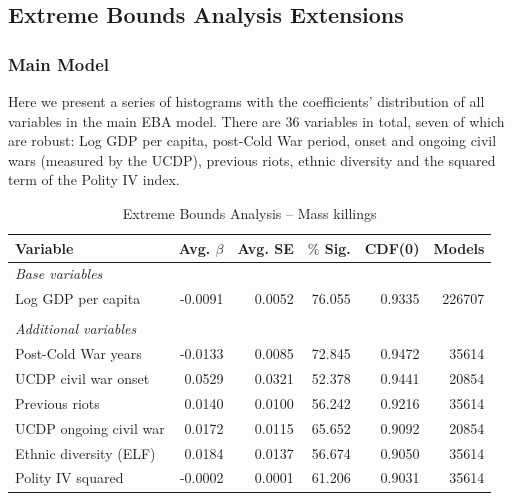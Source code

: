 \newpage

\subsection{Extreme Bounds Analysis Extensions}
\label{sec:mk-ebae}

\subsubsection{Main Model}

Here we present a series of histograms with the coefficients' distribution of all variables in the main EBA model. There are 36 variables in total, seven of which are robust: Log GDP per capita, post-Cold War period, onset and ongoing civil wars (measured by the UCDP), previous riots, ethnic diversity and the squared term of the Polity IV index.

\vspace{1cm}

\begin{table}[H]
\centering
\begin{tabular}{lrrrrr}
\hline
\textbf{Variable} & \textbf{Avg. $\beta$} & \textbf{Avg. SE} & \textbf{$\%$ Sig.} & \textbf{CDF(0)} & \textbf{Models} \\ \hline
\textit{Base variables} &  &  &  &  &  \\
Log GDP per capita & -0.0091 & 0.0052 & 76.055 & 0.9335 & 226707 \\
 &  &  &  &  &  \\
\textit{Additional variables} &  &  &  &  &  \\
Post-Cold War years & -0.0133 & 0.0085 & 72.845 & 0.9472 & 35614 \\
UCDP civil war onset & 0.0529 & 0.0321 & 52.378 & 0.9441 & 20854 \\
Previous riots & 0.0140 & 0.0100 & 56.242 & 0.9216 & 35614 \\
UCDP ongoing civil war & 0.0172 & 0.0115 & 65.652 & 0.9092 & 20854 \\
Ethnic diversity (ELF) & 0.0184 & 0.0137 & 56.674 & 0.9050 & 35614 \\
Polity IV squared & -0.0002 & 0.0001 & 61.206 & 0.9031 & 35614 \\ \hline
\end{tabular}
\caption{Extreme Bounds Analysis -- Mass killings}
\label{tab:mk}
\end{table}

